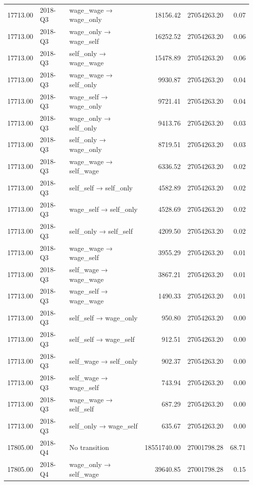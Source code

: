 \begin{table}[ht]
{\begin{tabular}{rllrrr}
  17713.00 & 2018-Q3 & wage\_wage → wage\_only & 18156.42 & 27054263.20 & 0.07 \\ 
  17713.00 & 2018-Q3 & wage\_only → wage\_self & 16252.52 & 27054263.20 & 0.06 \\ 
  17713.00 & 2018-Q3 & self\_only → wage\_wage & 15478.89 & 27054263.20 & 0.06 \\ 
  17713.00 & 2018-Q3 & wage\_wage → self\_only & 9930.87 & 27054263.20 & 0.04 \\ 
  17713.00 & 2018-Q3 & wage\_self → wage\_only & 9721.41 & 27054263.20 & 0.04 \\ 
  17713.00 & 2018-Q3 & wage\_only → self\_only & 9413.76 & 27054263.20 & 0.03 \\ 
  17713.00 & 2018-Q3 & self\_only → wage\_only & 8719.51 & 27054263.20 & 0.03 \\ 
  17713.00 & 2018-Q3 & wage\_wage → self\_wage & 6336.52 & 27054263.20 & 0.02 \\ 
  17713.00 & 2018-Q3 & self\_self → self\_only & 4582.89 & 27054263.20 & 0.02 \\ 
  17713.00 & 2018-Q3 & wage\_self → self\_only & 4528.69 & 27054263.20 & 0.02 \\ 
  17713.00 & 2018-Q3 & self\_only → self\_self & 4209.50 & 27054263.20 & 0.02 \\ 
  17713.00 & 2018-Q3 & wage\_wage → wage\_self & 3955.29 & 27054263.20 & 0.01 \\ 
  17713.00 & 2018-Q3 & self\_wage → wage\_wage & 3867.21 & 27054263.20 & 0.01 \\ 
  17713.00 & 2018-Q3 & wage\_self → wage\_wage & 1490.33 & 27054263.20 & 0.01 \\ 
  17713.00 & 2018-Q3 & self\_self → wage\_only & 950.80 & 27054263.20 & 0.00 \\ 
  17713.00 & 2018-Q3 & self\_self → wage\_self & 912.51 & 27054263.20 & 0.00 \\ 
  17713.00 & 2018-Q3 & self\_wage → self\_only & 902.37 & 27054263.20 & 0.00 \\ 
  17713.00 & 2018-Q3 & self\_wage → wage\_self & 743.94 & 27054263.20 & 0.00 \\ 
  17713.00 & 2018-Q3 & wage\_wage → self\_self & 687.29 & 27054263.20 & 0.00 \\ 
  17713.00 & 2018-Q3 & self\_only → wage\_self & 635.67 & 27054263.20 & 0.00 \\ 
  17805.00 & 2018-Q4 & No transition & 18551740.00 & 27001798.28 & 68.71 \\ 
  17805.00 & 2018-Q4 & wage\_only → self\_wage & 39640.85 & 27001798.28 & 0.15 \\ 

\end{tabular}}
\end{table}
